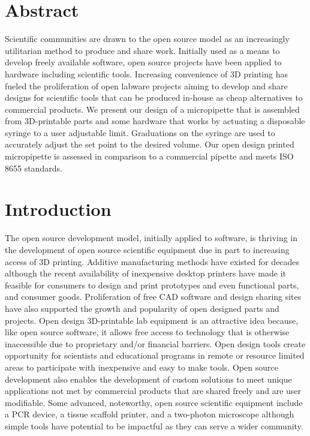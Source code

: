 \documentclass[10pt,letterpaper]{article}
\begin{document}
\section*{Abstract}
Scientific communities are drawn to the open source model as an increasingly utilitarian method to produce and share work.
Initially used as a means to develop freely available software, open source projects have been applied to hardware including scientific tools.
Increasing convenience of 3D printing has fueled the proliferation of open labware projects aiming to develop and share designs for scientific tools that can be produced in-house as cheap alternatives to commercial products.
We present our design of a micropipette that is assembled from 3D-printable parts and some hardware that works by actuating a disposable syringe to a user adjustable limit.
Graduations on the syringe are used to accurately adjust the set point to the desired volume.  
Our open design printed micropipette is assessed in comparison to a commercial pipette and meets ISO 8655 standards.

\linenumbers

\section*{Introduction}
The open source development model, initially applied to software, is thriving in the development of open source scientific equipment due in part to increasing access of 3D printing\cite{Baden2015,Pearce2013}.
Additive manufacturing methods have existed for decades although the recent availability of inexpensive desktop printers\cite{MakerbotIndustries,RepRap} have made it feasible for consumers to design and print prototypes and even functional parts, and consumer goods\cite{Fullerton2014,Wittbrodt2013}.
Proliferation of free CAD software\cite{OpenScad,Blender,SketchUp,123D} and design sharing sites\cite{Thingiverse,NationalInstitutesofHealth,GrabCAD,GitHubInc} have also supported the growth and popularity of open designed parts and projects.
Open design 3D-printable lab equipment is an attractive idea because, like open source software, it allows free access to technology that is otherwise inaccessible due to proprietary and/or financial barriers. 
Open design tools create opportunity for scientists and educational programs in remote or resource limited areas to participate with inexpensive and easy to make tools\cite{Marzullo2012,Lang2011,Fobel2013,Baker2014,Cybulski2014,Bhamla2017}.
Open source development also enables the development of custom solutions to meet unique applications not met by commercial products that are shared freely and are user modifiable\cite{Fullerton2014,Pearce2012,Rankin2014,Sulkin2013,Dryden2015,DaCosta2014,Tek2008}.
Some advanced, noteworthy, open source scientific equipment include a PCR device\cite{ChaiBiotechnologiesInc2015}, a tissue scaffold printer\cite{Trachtenberg2014}, and a two-photon microscope\cite{Rosenegger2014} although simple tools have potential to be impactful as they can serve a wider community.
\end{document}
